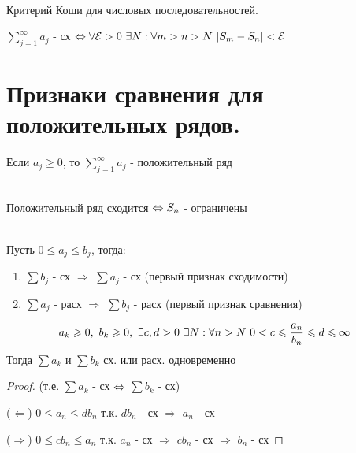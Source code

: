 \documentclass[11pt, fleqn]{article}
\begin{document}
\begin{Property}[3]
\begin{Property}[4]
\begin{Property}[2, аддитивность]
\begin{Reminder} 
\begin{theorem}\ \\
    Критерий Коши для числовых последовательностей. 
    
    $\sum\limits_{j=1}^\infty a_j$ - сх $\Leftrightarrow \forall \mathcal{E} > 0\ \exists N: \forall m>n>N\ |S_m-S_n|<\mathcal{E}$
\end{theorem}
\end{Reminder}

\newpage
\section{Признаки сравнения для положительных рядов.}
 
\begin{definition}
    Если $a_j \geqslant 0$, то $\sum\limits_{j=1}^\infty a_j$ - положительный ряд
\end{definition}

\begin{theorem}\ \\
    Положительный ряд сходится $\Leftrightarrow S_n$ - ограничены
\end{theorem}

\begin{consequence} \ \\
    Пусть $0 \leqslant a_j \leqslant b_j$, тогда:
    \begin{enumerate}
        \item $\sum b_j$ - сх $\Rightarrow$ $\sum a_j$ - сх (первый признак сходимости)
        \item $\sum a_j$ - расх $\Rightarrow$ $\sum b_j$ - расх (первый признак сравнения)
    \end{enumerate}
\end{consequence} 

\begin{Consequence}
    \[a_k \geqslant 0,\ b_k \geqslant 0,\ \exists c,d > 0\ \exists N: \forall n > N\ 0 < c \leqslant \frac{a_n}{b_n} \leqslant d \leqslant \infty\]
    Тогда $\sum a_k$ и $\sum b_k$ сх. или расх. одновременно
\end{Consequence}

\begin{proof}
    (т.е. $\sum a_k$ - сх $\Leftrightarrow$ $\sum b_k$ - сх)
    
    ($\Leftarrow$) $0 \leqslant a_n \leqslant d b_n$ т.к. $d b_n$ - сх $\Rightarrow$ $a_n$ - сх
    
    ($\Rightarrow$) $0 \leqslant c b_n \leqslant a_n$ т.к. $a_n$ - сх $\Rightarrow$ $c b_n$ - сх $\Rightarrow$ $b_n$ - сх
\end{proof}


\end{Property}
\end{Property}
\end{Property}
\end{document}
